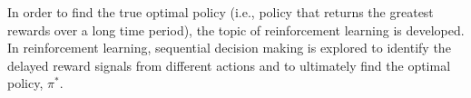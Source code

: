 In order to find the true optimal policy (i.e., policy that returns the greatest rewards over a long time period), the topic of reinforcement learning is developed.  In reinforcement learning, sequential decision making is explored to identify the delayed reward signals from different actions and to ultimately find the optimal policy, $\pi^*$.  